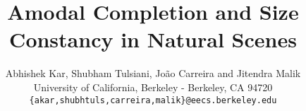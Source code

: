 \documentclass[10pt,twocolumn,letterpaper]{article}
\begin{document}
\title{Amodal Completion and Size Constancy in Natural Scenes}

\author{Abhishek Kar, Shubham Tulsiani, Jo\~{a}o Carreira and Jitendra Malik\\
University of California, Berkeley - Berkeley, CA 94720\\
{\tt\small \{akar,shubhtuls,carreira,malik\}@eecs.berkeley.edu}}

\maketitle



%




%
%



{\small


}
\end{document}
